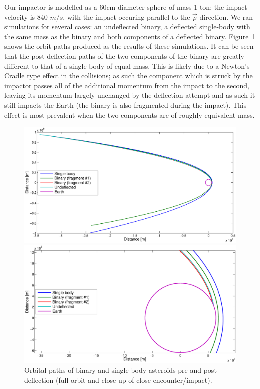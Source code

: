 \documentclass[letterpaper, preprint, paper,11pt]{AAS}	%
\begin{document}
Our impactor is modelled as a 60cm diameter sphere of mass 1 ton; the impact velocity is 840 $m/s$, with the impact occuring parallel to the $\vec{\rho}$ direction.
We ran simulations for several cases: an undeflected binary, a deflected single-body with the same mass as the binary and both components of a deflected binary. Figure~\ref{fig:bouncey} shows the orbit paths produced as the results of these simulations. It can be seen that the post-deflection paths of the two components of the binary are greatly different to that of a single body of equal mass. This is likely due to a Newton's Cradle type effect in the collisions; as such the component which is struck by the impactor passes all of the additional momentum from the impact to the second, leaving its momentum largely unchanged by the deflection attempt and as such it still impacts the Earth (the binary is also fragmented during the impact). This effect is most prevalent when the two components are of roughly equivalent mass.
\begin{figure}[H]
\centering
\centerline{\includegraphics[width=1.1\textwidth]{deflection_1.eps}}
\centerline{\includegraphics[width=1.1\textwidth]{deflection_0.eps}} 
\caption{Orbital paths of binary and single body asteroids pre and post deflection (full orbit and close-up of close encounter/impact).} 
\label{fig:bouncey}
\end{figure} 
\end{document}
